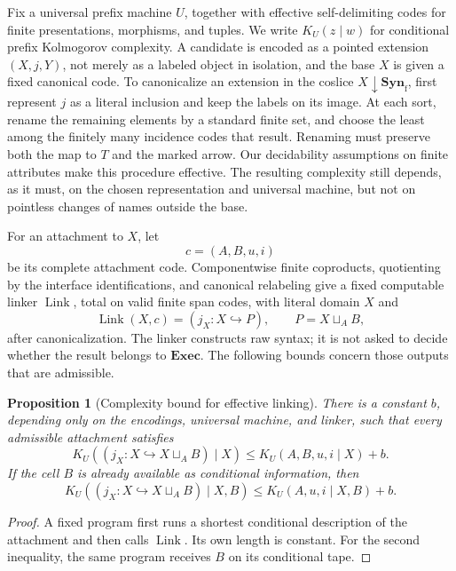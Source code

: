 \documentclass[11pt]{article}
\newtheorem{proposition}[theorem]{Proposition}
\newcommand{\Syn}{\mathbf{Syn}}
\newcommand{\Exec}{\mathbf{Exec}}
\newcommand{\K}{K_U}
\begin{document}
Fix a universal prefix machine \(U\), together with effective self-delimiting
codes for finite presentations, morphisms, and tuples.  We write
\(\K(z\mid w)\) for conditional prefix Kolmogorov complexity.  A candidate is
encoded as a pointed extension \((X,j,Y)\), not merely as a labeled object in
isolation, and the base \(X\) is given a fixed canonical code.  To
canonicalize an extension in the coslice
\(X\mathbin{\downarrow}\Syn_{\mathrm f}\), first represent \(j\) as a
literal inclusion and keep the labels on its image.  At each sort, rename the
remaining elements by a standard finite set, and choose the least among the
finitely many incidence codes that result.  Renaming must preserve both the
map to \(T\) and the marked arrow.  Our decidability assumptions on finite
attributes make this procedure effective.  The resulting complexity still
depends, as it must, on the chosen representation and universal machine, but
not on pointless changes of names outside the base.

For an attachment to \(X\), let
\[
 c=(A,B,u,i)
\]
be its complete attachment code.  Componentwise finite coproducts, quotienting
by the interface identifications, and canonical relabeling give a fixed
computable linker \(\operatorname{Link}\), total on valid finite span codes,
with literal domain \(X\) and
\[
 \operatorname{Link}(X,c)=(j_X:X\hookrightarrow P),
 \qquad P=X\sqcup_A B,
\]
after canonicalization.  The linker constructs raw syntax; it is not asked to
decide whether the result belongs to \(\Exec\).  The following bounds concern
those outputs that are admissible.

\begin{proposition}[Complexity bound for effective linking]\label{prop:gluing-bound}
There is a constant \(b\), depending only on the encodings, universal machine,
and linker, such that every admissible attachment satisfies
\[
 \K((j_X:X\hookrightarrow X\sqcup_A B)\mid X)
 \le \K(A,B,u,i\mid X)+b.
\]
If the cell \(B\) is already available as conditional information, then
\[
 \K((j_X:X\hookrightarrow X\sqcup_A B)\mid X,B)
 \le \K(A,u,i\mid X,B)+b.
\]
\end{proposition}

\begin{proof}
A fixed program first runs a shortest conditional description of the
attachment and then calls \(\operatorname{Link}\).  Its own length is constant.
For the second inequality, the same program receives \(B\) on its conditional
tape.
\end{proof}
\end{document}
